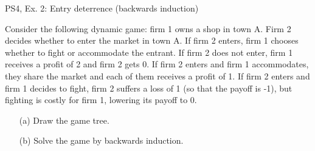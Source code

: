 %
%
%
\begin{frame}{PS4, Ex. 2: Entry deterrence (backwards induction)}
  \begin{multicols}{2}
    Consider the following dynamic game: firm 1 owns a shop in town A. Firm 2 decides whether to enter the market in town A. If firm 2 enters, firm 1 chooses whether to fight or accommodate the entrant. If firm 2 does not enter, firm 1 receives a profit of 2 and firm 2 gets 0. If firm 2 enters and firm 1 accommodates, they share the market and each of them receives a profit of 1. If firm 2 enters and firm 1 decides to fight, firm 2 suffers a loss of 1 (so that the payoff is -1), but fighting is costly for firm 1, lowering its payoff to 0.
    \begin{itemize}
      \item[(a)] Draw the game tree.
      \item[(b)] Solve the game by backwards induction.
    \end{itemize}
  \vfill\null \columnbreak
  \vfill\null
  \end{multicols}
\end{frame}
